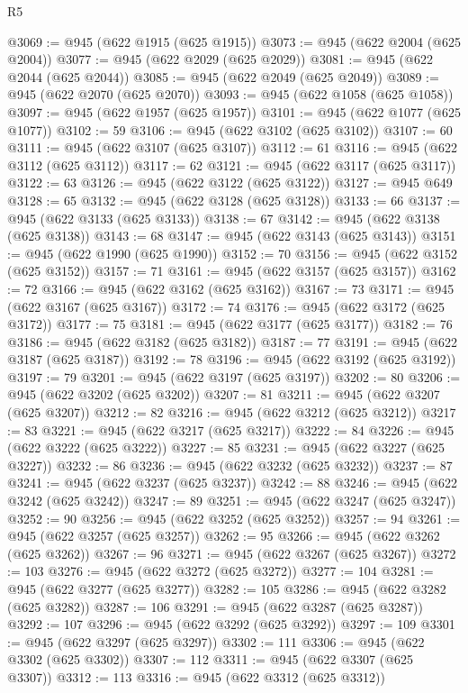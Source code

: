 \begin{lexlean}{R5}
\begin{coremodule}
@3069 := @945 (@622 @1915 (@625 @1915))
@3073 := @945 (@622 @2004 (@625 @2004))
@3077 := @945 (@622 @2029 (@625 @2029))
@3081 := @945 (@622 @2044 (@625 @2044))
@3085 := @945 (@622 @2049 (@625 @2049))
@3089 := @945 (@622 @2070 (@625 @2070))
@3093 := @945 (@622 @1058 (@625 @1058))
@3097 := @945 (@622 @1957 (@625 @1957))
@3101 := @945 (@622 @1077 (@625 @1077))
@3102 := 59
@3106 := @945 (@622 @3102 (@625 @3102))
@3107 := 60
@3111 := @945 (@622 @3107 (@625 @3107))
@3112 := 61
@3116 := @945 (@622 @3112 (@625 @3112))
@3117 := 62
@3121 := @945 (@622 @3117 (@625 @3117))
@3122 := 63
@3126 := @945 (@622 @3122 (@625 @3122))
@3127 := @945 @649
@3128 := 65
@3132 := @945 (@622 @3128 (@625 @3128))
@3133 := 66
@3137 := @945 (@622 @3133 (@625 @3133))
@3138 := 67
@3142 := @945 (@622 @3138 (@625 @3138))
@3143 := 68
@3147 := @945 (@622 @3143 (@625 @3143))
@3151 := @945 (@622 @1990 (@625 @1990))
@3152 := 70
@3156 := @945 (@622 @3152 (@625 @3152))
@3157 := 71
@3161 := @945 (@622 @3157 (@625 @3157))
@3162 := 72
@3166 := @945 (@622 @3162 (@625 @3162))
@3167 := 73
@3171 := @945 (@622 @3167 (@625 @3167))
@3172 := 74
@3176 := @945 (@622 @3172 (@625 @3172))
@3177 := 75
@3181 := @945 (@622 @3177 (@625 @3177))
@3182 := 76
@3186 := @945 (@622 @3182 (@625 @3182))
@3187 := 77
@3191 := @945 (@622 @3187 (@625 @3187))
@3192 := 78
@3196 := @945 (@622 @3192 (@625 @3192))
@3197 := 79
@3201 := @945 (@622 @3197 (@625 @3197))
@3202 := 80
@3206 := @945 (@622 @3202 (@625 @3202))
@3207 := 81
@3211 := @945 (@622 @3207 (@625 @3207))
@3212 := 82
@3216 := @945 (@622 @3212 (@625 @3212))
@3217 := 83
@3221 := @945 (@622 @3217 (@625 @3217))
@3222 := 84
@3226 := @945 (@622 @3222 (@625 @3222))
@3227 := 85
@3231 := @945 (@622 @3227 (@625 @3227))
@3232 := 86
@3236 := @945 (@622 @3232 (@625 @3232))
@3237 := 87
@3241 := @945 (@622 @3237 (@625 @3237))
@3242 := 88
@3246 := @945 (@622 @3242 (@625 @3242))
@3247 := 89
@3251 := @945 (@622 @3247 (@625 @3247))
@3252 := 90
@3256 := @945 (@622 @3252 (@625 @3252))
@3257 := 94
@3261 := @945 (@622 @3257 (@625 @3257))
@3262 := 95
@3266 := @945 (@622 @3262 (@625 @3262))
@3267 := 96
@3271 := @945 (@622 @3267 (@625 @3267))
@3272 := 103
@3276 := @945 (@622 @3272 (@625 @3272))
@3277 := 104
@3281 := @945 (@622 @3277 (@625 @3277))
@3282 := 105
@3286 := @945 (@622 @3282 (@625 @3282))
@3287 := 106
@3291 := @945 (@622 @3287 (@625 @3287))
@3292 := 107
@3296 := @945 (@622 @3292 (@625 @3292))
@3297 := 109
@3301 := @945 (@622 @3297 (@625 @3297))
@3302 := 111
@3306 := @945 (@622 @3302 (@625 @3302))
@3307 := 112
@3311 := @945 (@622 @3307 (@625 @3307))
@3312 := 113
@3316 := @945 (@622 @3312 (@625 @3312))

\end{coremodule}
\end{lexlean}
